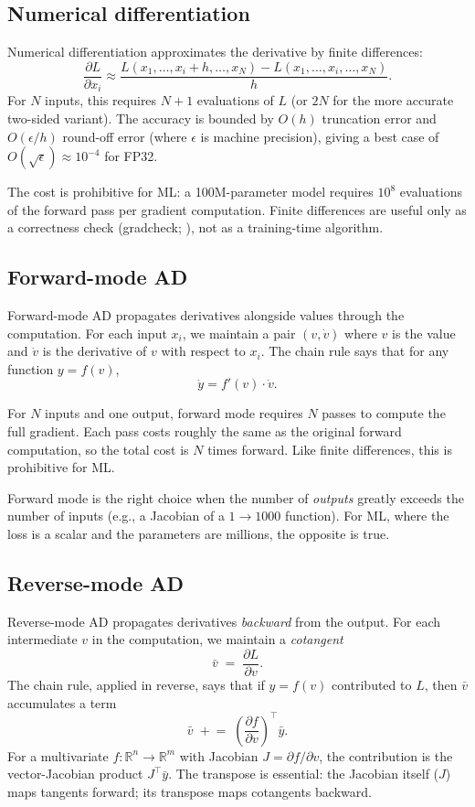 \subsection{Numerical differentiation}
\label{ssec:ad_theory:numerical}

Numerical differentiation approximates the derivative by finite
differences:
\[
\frac{\partial L}{\partial x_i} \approx
\frac{L(x_1, \ldots, x_i + h, \ldots, x_N) - L(x_1, \ldots, x_i,
\ldots, x_N)}{h}.
\]
For $N$ inputs, this requires $N + 1$ evaluations of $L$ (or $2N$
for the more accurate two-sided variant). The accuracy is bounded
by $O(h)$ truncation error and $O(\epsilon / h)$ round-off error
(where $\epsilon$ is machine precision), giving a best case of
$O(\sqrt{\epsilon}) \approx 10^{-4}$ for FP32.

The cost is prohibitive for ML: a 100M-parameter model requires
$10^8$ evaluations of the forward pass per gradient computation.
Finite differences are useful only as a correctness check
(gradcheck; ), not as a training-time
algorithm.

\subsection{Forward-mode AD}
\label{ssec:ad_theory:forward_mode}

Forward-mode AD propagates derivatives alongside values through
the computation. For each input $x_i$, we maintain a pair $(v,
\dot{v})$ where $v$ is the value and $\dot{v}$ is the derivative
of $v$ with respect to $x_i$. The chain rule says that for any
function $y = f(v)$,
\[
\dot{y} = f'(v) \cdot \dot{v}.
\]

For $N$ inputs and one output, forward mode requires $N$ passes
to compute the full gradient. Each pass costs roughly the same as
the original forward computation, so the total cost is $N$ times
forward. Like finite differences, this is prohibitive for ML.

Forward mode is the right choice when the number of \emph{outputs}
greatly exceeds the number of inputs (e.g., a Jacobian of a $1
\to 1000$ function). For ML, where the loss is a scalar and the
parameters are millions, the opposite is true.

\subsection{Reverse-mode AD}
\label{ssec:ad_theory:reverse_mode}

Reverse-mode AD propagates derivatives \emph{backward} from the
output. For each intermediate $v$ in the computation, we maintain
a \emph{cotangent}
\[
\bar{v} \;=\; \frac{\partial L}{\partial v}.
\]
The chain rule, applied in reverse, says that if $y = f(v)$
contributed to $L$, then $\bar{v}$ accumulates a term
\[
\bar{v} \;\mathrel{+}=\; \left(\frac{\partial f}{\partial
v}\right)^{\!\top} \bar{y}.
\]
For a multivariate $f : \mathbb{R}^n \to \mathbb{R}^m$ with
Jacobian $J = \partial f / \partial v$, the contribution is the
vector-Jacobian product $J^\top \bar{y}$. The transpose is
essential: the Jacobian itself ($J$) maps tangents forward; its
transpose maps cotangents backward.

